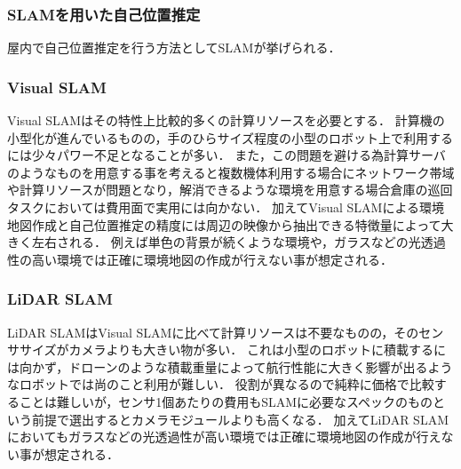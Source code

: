 \subsubsection{SLAMを用いた自己位置推定}
\label{slam_problem}
屋内で自己位置推定を行う方法としてSLAMが挙げられる．

\subsubsection{Visual SLAM}
Visual SLAMはその特性上比較的多くの計算リソースを必要とする．
計算機の小型化が進んでいるものの，手のひらサイズ程度の小型のロボット上で利用するには少々パワー不足となることが多い．
また，この問題を避ける為計算サーバのようなものを用意する事を考えると複数機体利用する場合にネットワーク帯域や計算リソースが問題となり，解消できるような環境を用意する場合倉庫の巡回タスクにおいては費用面で実用には向かない．
加えてVisual SLAMによる環境地図作成と自己位置推定の精度には周辺の映像から抽出できる特徴量によって大きく左右される．
例えば単色の背景が続くような環境や，ガラスなどの光透過性の高い環境では正確に環境地図の作成が行えない事が想定される．

\subsubsection{LiDAR SLAM}
LiDAR SLAMはVisual SLAMに比べて計算リソースは不要なものの，そのセンササイズがカメラよりも大きい物が多い．
これは小型のロボットに積載するには向かず，ドローンのような積載重量によって航行性能に大きく影響が出るようなロボットでは尚のこと利用が難しい．
役割が異なるので純粋に価格で比較することは難しいが，センサ1個あたりの費用もSLAMに必要なスペックのものという前提で選出するとカメラモジュールよりも高くなる．
加えてLiDAR SLAMにおいてもガラスなどの光透過性が高い環境では正確に環境地図の作成が行えない事が想定される．